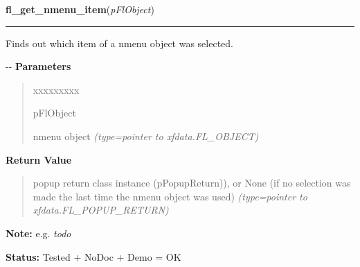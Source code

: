     \vspace{0.5ex}

\hspace{.8\funcindent}\begin{boxedminipage}{\funcwidth}

    \raggedright \textbf{fl\_get\_nmenu\_item}(\textit{pFlObject})

    \vspace{-1.5ex}

    \rule{\textwidth}{0.5\fboxrule}
\setlength{\parskip}{2ex}

Finds out which item of a nmenu object was selected.

-{}-
\setlength{\parskip}{1ex}
      \textbf{Parameters}
      \vspace{-1ex}

      \begin{quote}
        \begin{Ventry}{xxxxxxxxx}

          \item[pFlObject]


nmenu object
            {\it (type=pointer to xfdata.FL\_OBJECT)}

        \end{Ventry}

      \end{quote}

      \textbf{Return Value}
    \vspace{-1ex}

      \begin{quote}

popup return class instance (pPopupReturn)), or None (if no
selection was made the last time the nmenu object was used)
      {\it (type=pointer to xfdata.FL\_POPUP\_RETURN)}

      \end{quote}

\textbf{Note:} 
e.g. \emph{todo}


\textbf{Status:} 
Tested + NoDoc + Demo = OK


    \end{boxedminipage}

    \label{xformslib:flnmenu:fl_get_nmenu_item_by_value}

    \vspace{0.5ex}

